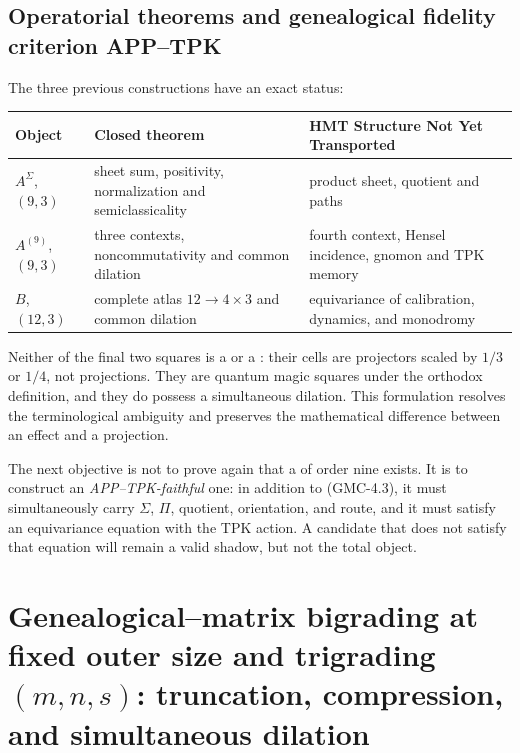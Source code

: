 \subsection{Operatorial theorems and genealogical fidelity criterion APP--TPK}

The three previous constructions have an exact status:

\begin{center}
\begin{tabularx}{.96\textwidth}{@{}L{.20\textwidth}L{.21\textwidth}Y@{}}
\toprule
Object & Closed theorem & HMT Structure Not Yet Transported\\
\midrule
$A^\Sigma$, $(9,3)$ & sheet sum, positivity, normalization and
semiclassicality & product sheet, quotient and paths\\
$A^{(9)}$, $(9,3)$ & three contexts, noncommutativity and common dilation &
fourth context, Hensel incidence, gnomon and TPK memory\\
$B$, $(12,3)$ & complete atlas $12\to4\times3$ and common dilation &
equivariance of calibration, dynamics, and monodromy\\
\bottomrule
\end{tabularx}
\end{center}

Neither of the final two squares is a \QLS or a \QPM: their cells are projectors scaled by $1/3$ or $1/4$, not projections. They are quantum magic squares under the orthodox definition, and they do possess a simultaneous dilation. This formulation resolves the terminological ambiguity and preserves the mathematical difference between an effect and a projection.

\begin{workbox}
The next objective is not to prove again that a \QMS of order
nine exists. It is to construct an \emph{APP--TPK-faithful} one: in addition to \textup{(GMC-4.3)}, it must
simultaneously carry $\Sigma$, $\Pi$, quotient, orientation, and route, and it must
satisfy an equivariance equation with the TPK action. A candidate
that does not satisfy that equation will remain a valid shadow, but not the total
object.
\end{workbox}


\section[Genealogical--Matrix Bigrading]{Genealogical--matrix
bigrading at fixed outer size and trigrading
\texorpdfstring{$(m,n,s)$}{(m,n,s)}: truncation, compression, and simultaneous
dilation}
\label{p12-83-c22-s4:gmc:chap:bigraduacion}

